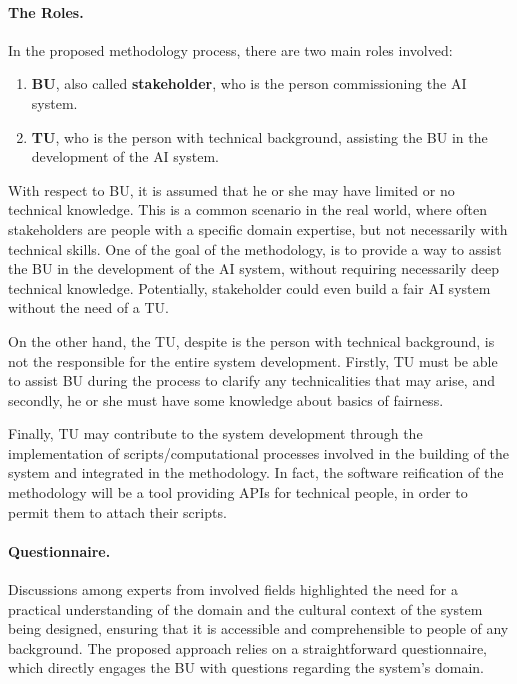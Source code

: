 \documentclass[12pt,a4paper,openright,twoside]{book}
\begin{document}
\paragraph{The Roles.}
In the proposed methodology process, there are two main roles involved:
\begin{enumerate}
    \item \textbf{\ac{BU}}, also called \textbf{stakeholder}, who is the person commissioning the \ac{AI} system.
    \item \textbf{\ac{TU}}, who is the person with technical background, assisting the \ac{BU} in the development of the \ac{AI} system.
\end{enumerate}

With respect to \ac{BU}, it is assumed that he or she may have limited or no technical knowledge.
%
This is a common scenario in the real world, where often stakeholders are people with a specific domain expertise, but not necessarily with technical skills.
%
One of the goal of the methodology, is to provide a way to assist the \ac{BU} in the development of the \ac{AI} system, without requiring necessarily deep technical knowledge.
%
Potentially, stakeholder could even build a fair \ac{AI} system without the need of a \ac{TU}.

On the other hand, the \acl{TU}, despite is the person with technical background, is not the responsible for the entire system development.
%
Firstly, \ac{TU} must be able to assist \ac{BU} during the process to clarify any technicalities that may arise, and secondly, he or she must have some knowledge about basics of fairness.

Finally, \ac{TU} may contribute to the system development through the implementation of scripts/computational processes involved in the building of the system and integrated in the methodology.
%
In fact, the software reification of the methodology will be a tool providing \acp{API} for technical people, in order to permit them to attach their scripts.


\paragraph{Questionnaire.}
Discussions among experts from involved fields highlighted the need for a practical understanding of the domain and the cultural context of the system being designed, ensuring that it is accessible and comprehensible to people of any background.
%
The proposed approach relies on a straightforward questionnaire, which directly engages the \acl{BU} with questions regarding the system's domain.
\end{document}
